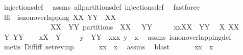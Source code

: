 \begin{isabellebody}
\ injections{\isacharunderscore}def\ \isamarkupfalse%
\ assms\ all{\isacharunderscore}partitions{\isacharunderscore}def\ injections{\isacharunderscore}def\ \isamarkupfalse%
\ fastforce%
\endisatagproof
{\isafoldproof}%
%
\isadelimproof
\isanewline
%
\endisadelimproof
\isanewline
{}\isamarkupfalse%
\ lll{}{}{\isacharcolon}\ \ {\isachardoublequoteopen}is{\isacharunderscore}non{\isacharunderscore}overlapping\ XX{\isachardoublequoteclose}\ {\isachardoublequoteopen}YY\ {\isasymsubseteq}\ XX{\isachardoublequoteclose}\ \isanewline
\ \ \ \ \ \ \ \ \ \ \ \ \ \ {\isachardoublequoteopen}{\isacharparenleft}XX\ {\isacharminus}\ YY{\isacharparenright}\ partitions\ {\isacharparenleft}{\isasymUnion}\ XX\ {\isacharminus}\ {\isasymUnion}\ YY{\isacharparenright}{\isachardoublequoteclose}\isanewline
%
\isadelimproof
%
\endisadelimproof
%
\isatagproof
{}\isamarkupfalse%
\ {\isacharminus}\isanewline
\ \ \isamarkupfalse%
\ {\isacharquery}xx{\isacharequal}{\isachardoublequoteopen}XX\ {\isacharminus}\ YY{\isachardoublequoteclose}\ \isamarkupfalse%
\ {\isacharquery}X{\isacharequal}{\isachardoublequoteopen}{\isasymUnion}\ XX{\isachardoublequoteclose}\ \isamarkupfalse%
\ {\isacharquery}Y{\isacharequal}{\isachardoublequoteopen}{\isasymUnion}\ YY{\isachardoublequoteclose}\isanewline
\ \ \isamarkupfalse%
\ {\isacharquery}x{\isacharequal}{\isachardoublequoteopen}{\isacharquery}X\ {\isacharminus}\ {\isacharquery}Y{\isachardoublequoteclose}\isanewline
\ \ \isamarkupfalse%
\ {\isachardoublequoteopen}{\isasymforall}\ y\ {\isasymin}\ YY{\isachardot}\ {\isasymforall}\ x{\isasymin}{\isacharquery}xx{\isachardot}\ y\ {\isasyminter}\ x{\isacharequal}{\isacharbraceleft}{\isacharbraceright}{\isachardoublequoteclose}\ \isamarkupfalse%
\ assms\ is{\isacharunderscore}non{\isacharunderscore}overlapping{\isacharunderscore}def\ \isamarkupfalse%
\ {\isacharparenleft}metis\ Diff{\isacharunderscore}iff\ set{\isacharunderscore}rev{\isacharunderscore}mp{\isacharparenright}\isanewline
\ \ \isamarkupfalse%
\ \isamarkupfalse%
\ {\isachardoublequoteopen}{\isasymUnion}\ {\isacharquery}xx\ {\isasymsubseteq}\ {\isacharquery}x{\isachardoublequoteclose}\ \isamarkupfalse%
\ assms\ \isamarkupfalse%
\ blast\isanewline
\ \ \isamarkupfalse%
\ \isamarkupfalse%
\ {\isachardoublequoteopen}{\isasymUnion}\ {\isacharquery}xx\ {\isacharequal}\ {\isacharquery}x{\isachardoublequoteclose}\ \isamarkupfalse%

\end{isabellebody}
